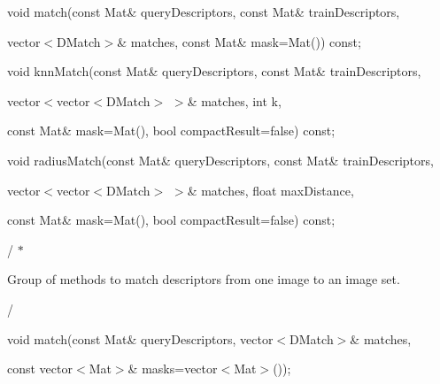 {\ttfamily }

{\ttfamily void match(const Mat\& query\+Descriptors, const Mat\& train\+Descriptors,}

{\ttfamily }

{\ttfamily }

{\ttfamily vector$<$\+D\+Match$>$\& matches, const Mat\& mask=Mat()) const;}

{\ttfamily }

{\ttfamily }

{\ttfamily void knn\+Match(const Mat\& query\+Descriptors, const Mat\& train\+Descriptors,}

{\ttfamily }

{\ttfamily }

{\ttfamily vector$<$vector$<$\+D\+Match$>$ $>$\& matches, int k,}

{\ttfamily }

{\ttfamily }

{\ttfamily const Mat\& mask=Mat(), bool compact\+Result=false) const;}

{\ttfamily }

{\ttfamily }

{\ttfamily void radius\+Match(const Mat\& query\+Descriptors, const Mat\& train\+Descriptors,}

{\ttfamily }

{\ttfamily }

{\ttfamily vector$<$vector$<$\+D\+Match$>$ $>$\& matches, float max\+Distance,}

{\ttfamily }

{\ttfamily }

{\ttfamily const Mat\& mask=Mat(), bool compact\+Result=false) const;}

{\ttfamily }

{\ttfamily }

{\ttfamily / $\ast$}

{\ttfamily  
\begin{DoxyItemize}
\item Group of methods to match descriptors from one image to an image set. 
\item / 
\end{DoxyItemize}}

{\ttfamily }

{\ttfamily void match(const Mat\& query\+Descriptors, vector$<$\+D\+Match$>$\& matches,}

{\ttfamily }

{\ttfamily }

{\ttfamily const vector$<$\+Mat$>$\& masks=vector$<$\+Mat$>$());}


